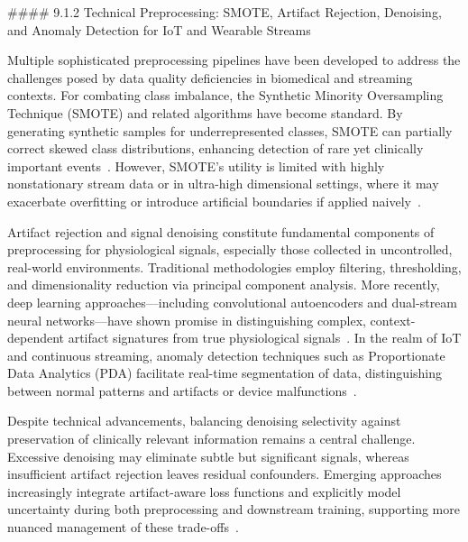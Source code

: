 \documentclass[11pt]{article}
\begin{document}
#### 9.1.2 Technical Preprocessing: SMOTE, Artifact Rejection, Denoising, and Anomaly Detection for IoT and Wearable Streams

Multiple sophisticated preprocessing pipelines have been developed to address the challenges posed by data quality deficiencies in biomedical and streaming contexts. For combating class imbalance, the Synthetic Minority Oversampling Technique (SMOTE) and related algorithms have become standard. By generating synthetic samples for underrepresented classes, SMOTE can partially correct skewed class distributions, enhancing detection of rare yet clinically important events~\cite{ref89,ref102}. However, SMOTE’s utility is limited with highly nonstationary stream data or in ultra-high dimensional settings, where it may exacerbate overfitting or introduce artificial boundaries if applied naively~\cite{ref106}.

Artifact rejection and signal denoising constitute fundamental components of preprocessing for physiological signals, especially those collected in uncontrolled, real-world environments. Traditional methodologies employ filtering, thresholding, and dimensionality reduction via principal component analysis. More recently, deep learning approaches—including convolutional autoencoders and dual-stream neural networks—have shown promise in distinguishing complex, context-dependent artifact signatures from true physiological signals~\cite{ref96,ref97}. In the realm of IoT and continuous streaming, anomaly detection techniques such as Proportionate Data Analytics (PDA) facilitate real-time segmentation of data, distinguishing between normal patterns and artifacts or device malfunctions~\cite{ref90}.

Despite technical advancements, balancing denoising selectivity against preservation of clinically relevant information remains a central challenge. Excessive denoising may eliminate subtle but significant signals, whereas insufficient artifact rejection leaves residual confounders. Emerging approaches increasingly integrate artifact-aware loss functions and explicitly model uncertainty during both preprocessing and downstream training, supporting more nuanced management of these trade-offs~\cite{ref106}.
\end{document}

